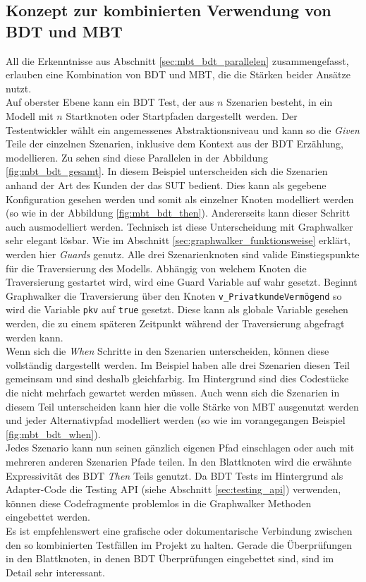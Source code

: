 \subsection{Konzept zur kombinierten Verwendung von BDT und MBT}
All die Erkenntnisse aus Abschnitt \ref{sec:mbt_bdt_parallelen} zusammengefasst, erlauben eine Kombination von \Gls{BDT} und \Gls{MBT}, die die Stärken beider Ansätze nutzt.\\
Auf oberster Ebene kann ein \Gls{BDT} Test, der aus $n$ Szenarien besteht, in ein Modell mit $n$ Startknoten oder Startpfaden dargestellt werden. Der Testentwickler wählt ein angemessenes Abstraktionsniveau und kann so die \textit{Given} Teile der einzelnen Szenarien, inklusive dem Kontext aus der \Gls{BDT} Erzählung, modellieren. Zu sehen sind diese Parallelen in der Abbildung \ref{fig:mbt_bdt_gesamt}. In diesem Beispiel unterscheiden sich die Szenarien anhand der Art des Kunden der das \Gls{SUT} bedient. Dies kann als gegebene Konfiguration gesehen werden und somit als einzelner Knoten modelliert werden (so wie in der Abbildung \ref{fig:mbt_bdt_then}). Andererseits kann dieser Schritt auch ausmodelliert werden. Technisch ist diese Unterscheidung mit Graphwalker sehr elegant lösbar. Wie im Abschnitt \ref{sec:graphwalker_funktionsweise}  erklärt, werden hier \textit{Guards} genutz. Alle drei Szenarienknoten sind valide Einstiegspunkte für die Traversierung des Modells. Abhängig von welchem Knoten die Traversierung gestartet wird, wird eine Guard Variable auf wahr gesetzt. Beginnt Graphwalker die Traversierung über den Knoten \texttt{v\_PrivatkundeVermögend} so wird die Variable \texttt{pkv} auf \texttt{true} gesetzt. Diese kann als globale Variable gesehen werden, die zu einem späteren Zeitpunkt während der Traversierung abgefragt werden kann.\\
Wenn sich die \textit{When} Schritte in den Szenarien unterscheiden, können diese vollständig dargestellt werden. Im Beispiel haben alle drei Szenarien diesen Teil gemeinsam und sind deshalb gleichfarbig. Im Hintergrund sind dies Codestücke die nicht mehrfach gewartet werden müssen. Auch wenn sich die Szenarien in diesem Teil unterscheiden kann hier die volle Stärke von \Gls{MBT} ausgenutzt werden und jeder Alternativpfad modelliert werden (so wie im vorangegangen Beispiel \ref{fig:mbt_bdt_when}).\\
Jedes Szenario kann nun seinen gänzlich eigenen Pfad einschlagen oder auch mit mehreren anderen Szenarien Pfade teilen. In den Blattknoten wird die erwähnte Expressivität des \Gls{BDT} \textit{Then} Teils genutzt. Da \Gls{BDT} Tests im Hintergrund als Adapter-Code die Testing API (siehe Abschnitt \ref{sec:testing_api}) verwenden, können diese Codefragmente problemlos in die Graphwalker Methoden eingebettet werden.\\
Es ist empfehlenswert eine grafische oder dokumentarische Verbindung zwischen den so kombinierten Testfällen im Projekt zu halten. Gerade die Überprüfungen in den Blattknoten, in denen \Gls{BDT} Überprüfungen eingebettet sind, sind im Detail sehr interessant.

